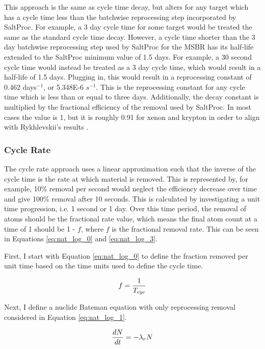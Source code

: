 This approach is the same as cycle time decay, but alters for any target which has a cycle time less than the batchwise reprocessing step incorporated by SaltProc. For example, a 3 day cycle time for some target would be treated the same as the standard cycle time decay. However, a cycle time shorter than the 3 day batchwise reprocessing step used by SaltProc for the MSBR has its half-life extended to the SaltProc minimum value of 1.5 days. For example, a 30 second cycle time would instead be treated as a 3 day cycle time, which would result in a half-life of 1.5 days. Plugging in, this would result in a reprocessing constant of 0.462 days$^{-1}$, or 5.348E-6 $s^{-1}$. This is the reprocessing constant for any cycle time which is less than or equal to three days. Additionally, the decay constant is multiplied by the fractional efficiency of the removal used by SaltProc. In most cases the value is 1, but it is roughly 0.91 for xenon and krypton in order to align with Rykhlevskii's results \cite{rykhlevskii_fuel_2020}.

\subsubsection{Cycle Rate}
\label{s:CR}

The cycle rate approach uses a linear approximation such that the inverse of the cycle time is the rate at which material is removed. This is represented by, for example, 10\% removal per second would neglect the efficiency decrease over time and give 100\% removal after 10 seconds. This is calculated by investigating a unit time progression, i.e. 1 second or 1 day. Over this time period, the removal of atoms should be the fractional rate value, which means the final atom count at a time of 1 should be 1 - $f$, where $f$ is the fractional removal rate. This can be seen in Equations \eqref{eq:nat_log_0} and \eqref{eq:nat_log_3}.

First, I start with Equation \eqref{eq:nat_log_0} to define the fraction removed per unit time based on the time units used to define the cycle time.

\begin{equation} \hfill
f = \frac{1}{T_{cyc}}
\hfill\label{eq:nat_log_0} \end{equation}

Next, I define a nuclide Bateman equation with only reprocessing removal considered in Equation \eqref{eq:nat_log_1}.

\begin{equation} \hfill
\frac{dN}{dt} = -\lambda_r N
\hfill\label{eq:nat_log_1} \end{equation}

